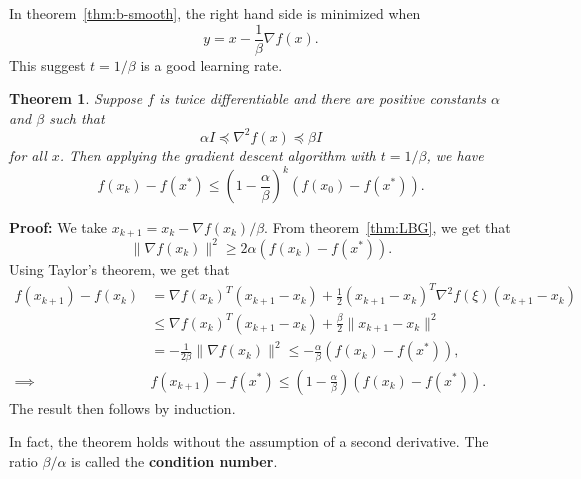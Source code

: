 \documentclass[12pt]{article}
\newtheorem{theorem}{Theorem}[section]
\theoremstyle{definition}
\theoremstyle{remark}
\begin{document}
In theorem~\ref{thm:b-smooth}, the right hand side is minimized when
\[
	y = x - \frac{1}{\beta} \nabla f(x)
.\]
This suggest $t = 1/\beta$ is a good learning rate.

\begin{theorem}
\label{thm:grad-desc-bound}
	Suppose $f$ is twice differentiable and there are positive constants $\alpha$ and $\beta$ such that
	\[
		\alpha I \preceq \nabla^2 f(x) \preceq \beta I
	\]
	for all $x$. Then applying the gradient descent algorithm with $t = 1/\beta$, we have
	\[
		f(x_k) - f(x^{\ast}) \leq \left(1 - \frac{\alpha}{\beta} \right)^{k} (f(x_0) - f(x^{\ast}))
	.\]
\end{theorem}

\begin{adjustbox}{minipage = \columnwidth - 25.5pt, margin=1em, frame=1pt, margin=0em}
	\textbf{Proof:} We take $x_{k+1} = x_{k} - \nabla f(x_k)/\beta$. From theorem~\ref{thm:LBG}, we get that
	\[
		\| \nabla f(x_k) \|^2 \geq 2 \alpha (f(x_k) - f(x^{\ast}))
	.\]
	Using Taylor's theorem, we get that
	\begin{align*}
		f(x_{k+1}) - f(x_k) &= \nabla f(x_k)^{T} (x_{k+1} - x_k) + \frac{1}{2} (x_{k+1} - x_k)^{T} \nabla^2 f(\xi) (x_{k+1} - x_k) \\
				    &\leq \nabla f(x_k)^{T} (x_{k+1} - x_k) + \frac{\beta}{2} \|x_{k+1} - x_k \|^2 \\
				    &= - \frac{1}{2 \beta} \| \nabla f(x_k) \|^2 \leq - \frac{\alpha}{\beta} (f(x_k) - f(x^{\ast})), \\
		\implies& f(x_{k+1}) - f(x^{\ast}) \leq \left(1 - \frac{\alpha}{\beta} \right) (f(x_k) - f(x^{\ast})).
	\end{align*}
	The result then follows by induction.
\end{adjustbox}

In fact, the theorem holds without the assumption of a second derivative. The ratio $\beta/\alpha$ is called the \textbf{condition number}.
\end{document}
